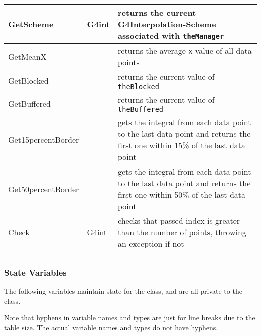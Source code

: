 \documentclass[12pt]{article}
\newcommand{\todo}[1]{\textcolor{red}{[TODO: #1]}} \else
\newcommand{\authornote}[3]{} \newcommand{\todo}[1]{} \fi
\newcommand{\mmp}[1]{\authornote{green}{MP}{#1}}
\begin{document}
\begin{longtable}{p{}p{}p{}}
GetScheme & G4int & returns the current G4Interpolation-Scheme associated with \texttt{theManager}\\\hline
GetMeanX & & returns the average \texttt{x} value of all data points\\\hline
GetBlocked & & returns the current value of \texttt{theBlocked}\\\hline
GetBuffered & &  returns the current value of \texttt{theBuffered}\\\hline
Get15percentBorder & & gets the integral from each data point to the last data point and returns the first one within 
15\% of the last data point \\\hline
Get50percentBorder & & gets the integral from each data point to the last data point and returns the first one within 
50\% of the last data point\\\hline
Check & G4int & checks that passed index is greater than the number of points, throwing an exception if not\\
\arrayrulecolor{black}
\bottomrule
\end{longtable}
\mmp{commented out energy and Xsec functions since X and Y do the exact same thing. Our code no longer has those functions}
\mmp{We do not need the hash function since it was used to make cpu execution faster, which we are porting to the gpu}

\subsubsection{State Variables}%
The following variables maintain state for the class, and are all private to the class.

Note that hyphens in variable names and types are just for line breaks due to the table size. The actual variable names and types do not have hyphens.
\end{document}
